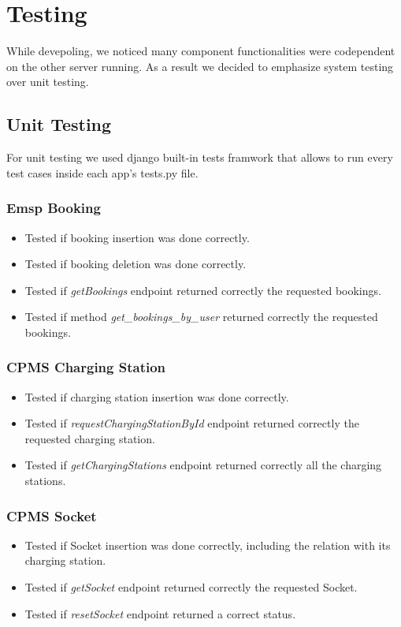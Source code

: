 \documentclass[table, 12pt]{article}
\begin{document}
\newpage
\section{Testing}
While devepoling, we noticed many component functionalities were codependent on the other server running. As a result we decided to emphasize system testing over
unit testing.

\subsection{Unit Testing}
For unit testing we used django built-in tests framwork that allows to run every test cases inside each app's tests.py file.
\subsubsection*{Emsp Booking}
\begin{itemize}
    \item Tested if booking insertion was done correctly.
    \item Tested if booking deletion was done correctly.
    \item Tested if \textit{getBookings} endpoint returned correctly the requested bookings.
    \item Tested if method \textit{get\_bookings\_by\_user} returned correctly the requested bookings.
\end{itemize}
\subsubsection*{CPMS Charging Station}
\begin{itemize}
    \item Tested if charging station insertion was done correctly.
    \item Tested if \textit{requestChargingStationById} endpoint returned correctly the requested charging station.
    \item Tested if \textit{getChargingStations} endpoint returned correctly all the charging stations.
\end{itemize}
\subsubsection*{CPMS Socket}
\begin{itemize}
    \item Tested if Socket insertion was done correctly, including the relation with its charging station.
    \item Tested if \textit{getSocket} endpoint returned correctly the requested Socket.
    \item Tested if \textit{resetSocket} endpoint returned a correct status.
\end{itemize}
\end{document}

